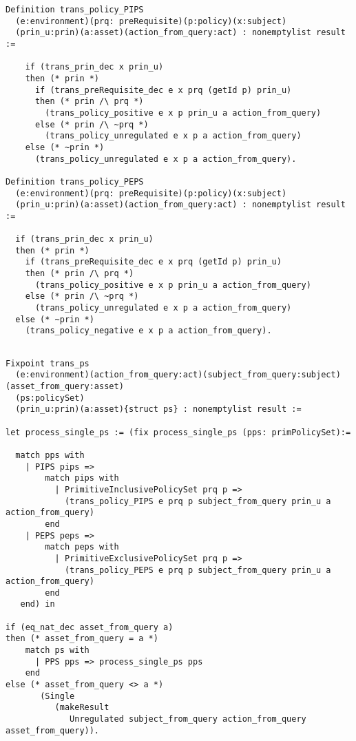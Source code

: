 \begin{minipage}{\linewidth}
\begin{lstlisting}
Definition trans_policy_PIPS
  (e:environment)(prq: preRequisite)(p:policy)(x:subject)
  (prin_u:prin)(a:asset)(action_from_query:act) : nonemptylist result :=
  
    if (trans_prin_dec x prin_u)
    then (* prin *)
      if (trans_preRequisite_dec e x prq (getId p) prin_u)
      then (* prin /\ prq *)
        (trans_policy_positive e x p prin_u a action_from_query)                           
      else (* prin /\ ~prq *)
        (trans_policy_unregulated e x p a action_from_query)
    else (* ~prin *)
      (trans_policy_unregulated e x p a action_from_query).

Definition trans_policy_PEPS
  (e:environment)(prq: preRequisite)(p:policy)(x:subject)
  (prin_u:prin)(a:asset)(action_from_query:act) : nonemptylist result :=
  
  if (trans_prin_dec x prin_u)
  then (* prin *)
    if (trans_preRequisite_dec e x prq (getId p) prin_u)
    then (* prin /\ prq *)
      (trans_policy_positive e x p prin_u a action_from_query)
    else (* prin /\ ~prq *)
      (trans_policy_unregulated e x p a action_from_query)
  else (* ~prin *)
    (trans_policy_negative e x p a action_from_query).

\end{lstlisting}
\end{minipage}


\begin{lstlisting}

Fixpoint trans_ps
  (e:environment)(action_from_query:act)(subject_from_query:subject)(asset_from_query:asset)
  (ps:policySet)
  (prin_u:prin)(a:asset){struct ps} : nonemptylist result :=

let process_single_ps := (fix process_single_ps (pps: primPolicySet):=
  
  match pps with 
    | PIPS pips => 
        match pips with 
          | PrimitiveInclusivePolicySet prq p => 
            (trans_policy_PIPS e prq p subject_from_query prin_u a action_from_query)                
        end
    | PEPS peps => 
        match peps with 
          | PrimitiveExclusivePolicySet prq p => 
            (trans_policy_PEPS e prq p subject_from_query prin_u a action_from_query)
        end  
   end) in

if (eq_nat_dec asset_from_query a)
then (* asset_from_query = a *)  
    match ps with
      | PPS pps => process_single_ps pps
    end
else (* asset_from_query <> a *)
       (Single 
          (makeResult 
             Unregulated subject_from_query action_from_query asset_from_query)).
\end{lstlisting}



